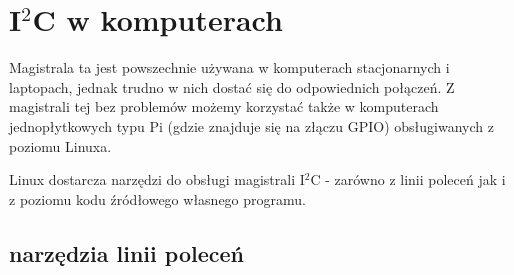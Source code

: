% 
% 
% 
% 

\ifdefined\mysection
	\def\useExternalSection{TRUE}
\else
	\newcommand\mysection[1]{\section{#1}}
	\newcommand\mysubsection[1]{\subsection{#1}}
\fi

\mysection{I$^2$C w komputerach}

Magistrala ta jest powszechnie używana w komputerach stacjonarnych i laptopach, jednak trudno w nich dostać się do odpowiednich połączeń.
Z magistrali tej bez problemów możemy korzystać także w komputerach jednopłytkowych typu Pi (gdzie znajduje się na złączu GPIO) obsługiwanych z poziomu Linuxa.

Linux dostarcza narzędzi do obsługi magistrali I$^2$C - zarówno z linii poleceń jak i z poziomu kodu źródłowego własnego programu.

\mysubsection{narzędzia linii poleceń}

